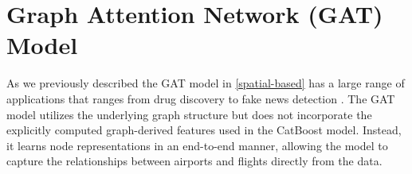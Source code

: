 \section{Graph Attention Network (GAT) Model}

As we previously described the GAT model in \ref{spatial-based} has a large range of applications that ranges from drug discovery to fake news detection \cite{keywordsCaravanti}.
The GAT model utilizes the underlying graph structure but does not incorporate the explicitly computed graph-derived features used in the CatBoost model. Instead, it learns node representations in an end-to-end manner, allowing the model to capture the relationships between airports and flights directly from the data.
